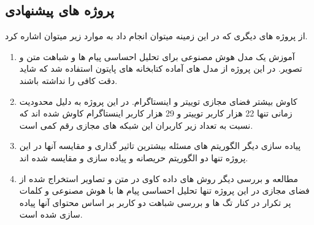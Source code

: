 \documentclass[12pt]{article}
\begin{document}
\subsection{پروژه های پیشنهادی}
 از پروژه های دیگری که در این زمینه میتوان انجام داد به موارد زیر میتوان اشاره کرد.

\begin{enumerate}
\item
آموزش یک مدل هوش مصنوعی برای تحلیل احساسی پیام ها و شباهت متن و تصویر. در این پروژه از مدل های آماده کتابخانه های پایتون استفاده شد که شاید دقت کافی را نداشته باشند.


\item
کاوش بیشتر فضای مجازی توییتر و اینستاگرام. در این پروژه به دلیل محدودیت زمانی تنها 22 هزار کاربر توییتر و 29 هزار کاربر اینستاگرام کاوش شده اند که نسبت به تعداد زیر کاربران این شبکه های مجازی رقم کمی است.

\item
پیاده سازی دیگر الگوریتم های مسئله بیشترین تاثیر گذاری و مقایسه آنها در این پروژه تنها دو الگوریتم حریصانه و 
پیاده سازی و مقایسه شده اند.

\item
مطالعه و بررسی دیگر روش های داده کاوی در متن و تصاویر استخراج شده از فضای مجازی در این پروژه تنها تحلیل احساسی پیام ها با هوش مصنوعی و کلمات پر تکرار در کنار تگ ها و بررسی شباهت دو کاربر بر اساس محتوای آنها پیاده سازی شده است.

\end{enumerate}




\begin{latin}

\end{latin}
\end{document}

